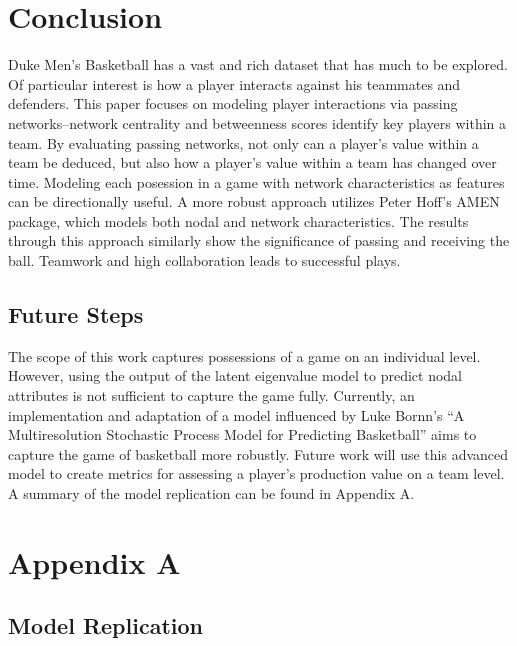 \documentclass[12pt,twoside]{dukestatscithesis}
\theoremstyle{definition}
\theoremstyle{definition}
\theoremstyle{definition}
\theoremstyle{remark}
\begin{document}
\chapter{Conclusion}\label{conclusion}

Duke Men's Basketball has a vast and rich dataset that has much to be
explored. Of particular interest is how a player interacts against his
teammates and defenders. This paper focuses on modeling player
interactions via passing networks--network centrality and betweenness
scores identify key players within a team. By evaluating passing
networks, not only can a player's value within a team be deduced, but
also how a player's value within a team has changed over time. Modeling
each posession in a game with network characteristics as features can be
directionally useful. A more robust approach utilizes Peter Hoff's AMEN
package, which models both nodal and network characteristics. The
results through this approach similarly show the significance of passing
and receiving the ball. Teamwork and high collaboration leads to
successful plays.

\section{Future Steps}\label{future-steps}

The scope of this work captures possessions of a game on an individual
level. However, using the output of the latent eigenvalue model to
predict nodal attributes is not sufficient to capture the game fully.
Currently, an implementation and adaptation of a model influenced by
Luke Bornn's ``A Multiresolution Stochastic Process Model for Predicting
Basketball'' aims to capture the game of basketball more robustly.
Future work will use this advanced model to create metrics for assessing
a player's production value on a team level. A summary of the model
replication can be found in Appendix A.

\chapter{Appendix A}\label{appendix-a}

\section{Model Replication}\label{model-replication}
\end{document}
